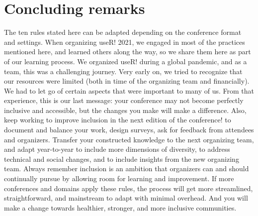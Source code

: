 \documentclass[10pt,letterpaper]{article}
\begin{document}

\section*{Concluding remarks}

The ten rules stated here can be adapted depending on the conference format and settings.
When organizing useR! 2021, we engaged in most of the practices mentioned here, and learned others along the way, so we share them here as part of our learning process. 
We organized useR! during a global pandemic, and as a team, this was a challenging journey. 
Very early on, we tried to recognize that our resources were limited (both in time of the organizing team and financially). 
We had to let go of certain aspects that were important to many of us. 
From that experience, this is our last message: your conference may not become perfectly inclusive and accessible, but the changes you make will make a difference.
Also, keep working to improve inclusion in the next edition of the conference! to document and balance your work, design surveys, ask for feedback from attendees and organizers. Transfer your constructed knowledge to the next organizing team, and adapt year-to-year to include more dimensions of diversity, to address technical and social changes, and to include insights from the new organizing team. Always remember inclusion is an ambition that organizers can and should continually pursue by allowing room for learning and improvement.
If more conferences and domains apply these rules, the process will get more streamlined, straightforward, and mainstream to adapt with minimal overhead.
And you will make a change towards healthier, stronger, and more inclusive communities.
\end{document}
